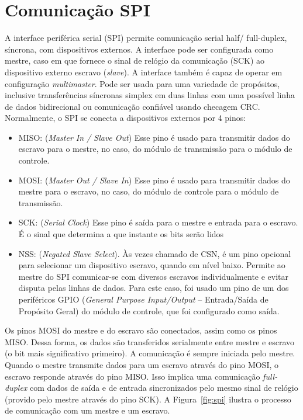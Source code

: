 \chapter{Comunicação SPI}\label{cap:com_spi}

A interface periférica serial (SPI) permite comunicação serial half/ full-duplex, síncrona, com dispositivos externos. A interface pode ser configurada como mestre, caso em que fornece o sinal de relógio da comunicação (SCK) ao dispositivo externo escravo (\textit{slave}). A interface também é capaz de operar em configuração \textit{multimaster}.
Pode ser usada para uma variedade de propósitos, inclusive transferências síncronas simplex em duas linhas com uma possível linha de dados bidirecional ou comunicação confiável usando checagem CRC.
Normalmente, o SPI se conecta a dispositivos externos por 4 pinos:
\begin{itemize}
\item MISO: (\textit{Master In / Slave Out}) Esse pino é usado para transmitir dados do escravo para o mestre, no caso, do módulo de transmissão para o módulo de controle.
\item MOSI: (\textit{Master Out / Slave In}) Esse pino é usado para transmitir dados do mestre para o escravo, no caso, do módulo de controle para o módulo de transmissão.
\item SCK: (\textit{Serial Clock}) Esse pino é saída para o mestre e entrada para o escravo. É o sinal que determina a que instante os bits serão lidos
\item NSS: (\textit{Negated Slave Select}). Às vezes chamado de CSN, é um pino opcional para selecionar um dispositivo escravo, quando em nível baixo. Permite ao mestre do SPI comunicar-se com diversos escravos individualmente e evitar disputa pelas linhas de dados. Para este caso, foi usado um pino de um dos periféricos GPIO (\textit{General Purpose Input/Output} – Entrada/Saída de Propósito Geral) do módulo de controle, que foi configurado como saída.
\end{itemize}

Os pinos MOSI do mestre e do escravo são conectados, assim como os pinos MISO. Dessa forma, os dados são transferidos serialmente entre mestre e escravo (o bit mais significativo primeiro).
A comunicação é sempre iniciada pelo mestre. Quando o mestre transmite dados para um escravo através do pino MOSI, o escravo responde através do pino MISO. Isso implica uma comunicação \textit{full-duplex} com dados de saída e de entrada sincronizados pelo mesmo sinal de relógio (provido pelo mestre através do pino SCK).
A Figura~\ref{fig:spi} ilustra o processo de comunicação com um mestre e um escravo.

